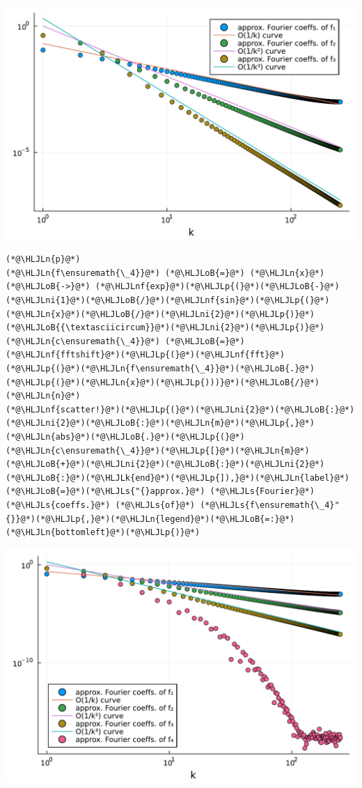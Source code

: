 \documentclass[12pt,landscape]{article}
\newcommand{\HLJLk}[1]{\textcolor[RGB]{148,91,176}{\textbf{#1}}}
\newcommand{\HLJLn}[1]{#1}
\newcommand{\HLJLnf}[1]{\textcolor[RGB]{66,102,213}{#1}}
\newcommand{\HLJLs}[1]{\textcolor[RGB]{201,61,57}{#1}}
\newcommand{\HLJLni}[1]{\textcolor[RGB]{59,151,46}{#1}}
\newcommand{\HLJLoB}[1]{\textcolor[RGB]{102,102,102}{\textbf{#1}}}
\newcommand{\HLJLp}[1]{#1}
\begin{document}
{\includegraphics[width=\linewidth]{jl_qsW2Qg/Fourier_24_1.pdf}

\begin{lstlisting}
(*@\HLJLn{p}@*)
(*@\HLJLn{f\ensuremath{\_4}}@*) (*@\HLJLoB{=}@*) (*@\HLJLn{x}@*) (*@\HLJLoB{->}@*) (*@\HLJLnf{exp}@*)(*@\HLJLp{(}@*)(*@\HLJLoB{-}@*)(*@\HLJLni{1}@*)(*@\HLJLoB{/}@*)(*@\HLJLnf{sin}@*)(*@\HLJLp{(}@*)(*@\HLJLn{x}@*)(*@\HLJLoB{/}@*)(*@\HLJLni{2}@*)(*@\HLJLp{)}@*)(*@\HLJLoB{{\textasciicircum}}@*)(*@\HLJLni{2}@*)(*@\HLJLp{)}@*)
(*@\HLJLn{c\ensuremath{\_4}}@*) (*@\HLJLoB{=}@*) (*@\HLJLnf{fftshift}@*)(*@\HLJLp{(}@*)(*@\HLJLnf{fft}@*)(*@\HLJLp{(}@*)(*@\HLJLn{f\ensuremath{\_4}}@*)(*@\HLJLoB{.}@*)(*@\HLJLp{(}@*)(*@\HLJLn{x}@*)(*@\HLJLp{)))}@*)(*@\HLJLoB{/}@*)(*@\HLJLn{n}@*)
(*@\HLJLnf{scatter!}@*)(*@\HLJLp{(}@*)(*@\HLJLni{2}@*)(*@\HLJLoB{:}@*)(*@\HLJLni{2}@*)(*@\HLJLoB{:}@*)(*@\HLJLn{m}@*)(*@\HLJLp{,}@*)(*@\HLJLn{abs}@*)(*@\HLJLoB{.}@*)(*@\HLJLp{(}@*)(*@\HLJLn{c\ensuremath{\_4}}@*)(*@\HLJLp{[}@*)(*@\HLJLn{m}@*)(*@\HLJLoB{+}@*)(*@\HLJLni{2}@*)(*@\HLJLoB{:}@*)(*@\HLJLni{2}@*)(*@\HLJLoB{:}@*)(*@\HLJLk{end}@*)(*@\HLJLp{]),}@*)(*@\HLJLn{label}@*)(*@\HLJLoB{=}@*)(*@\HLJLs{"{}approx.}@*) (*@\HLJLs{Fourier}@*) (*@\HLJLs{coeffs.}@*) (*@\HLJLs{of}@*) (*@\HLJLs{f\ensuremath{\_4}"{}}@*)(*@\HLJLp{,}@*)(*@\HLJLn{legend}@*)(*@\HLJLoB{=:}@*)(*@\HLJLn{bottomleft}@*)(*@\HLJLp{)}@*)
\end{lstlisting}

\includegraphics[width=\linewidth]{jl_qsW2Qg/Fourier_25_1.pdf}

}
\end{document}
